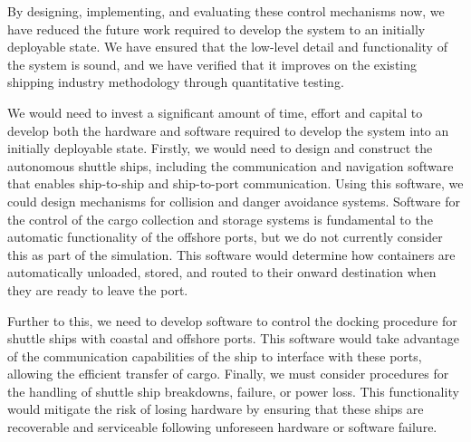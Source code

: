 By designing, implementing, and evaluating these control mechanisms now, we have reduced the future work required to develop the system to an initially deployable state. We have ensured that the low-level detail and functionality of the system is sound, and we have verified that it improves on the existing shipping industry methodology through quantitative testing.

We would need to invest a significant amount of time, effort and capital to develop both the hardware and software required to develop the system into an initially deployable state. Firstly, we would need to design and construct the autonomous shuttle ships, including the communication and navigation software that enables ship-to-ship and ship-to-port communication. Using this software, we could design mechanisms for collision and danger avoidance systems. Software for the control of the cargo collection and storage systems is fundamental to the automatic functionality of the offshore ports, but we do not currently consider this as part of the simulation. This software would determine how containers are automatically unloaded, stored, and routed to their onward destination when they are ready to leave the port.

Further to this, we need to develop software to control the docking procedure for shuttle ships with coastal and offshore ports. This software would take advantage of the communication capabilities of the ship to interface with these ports, allowing the efficient transfer of cargo. Finally, we must consider procedures for the handling of shuttle ship breakdowns, failure, or power loss. This functionality would mitigate the risk of losing hardware by ensuring that these ships are recoverable and serviceable following unforeseen hardware or software failure.
